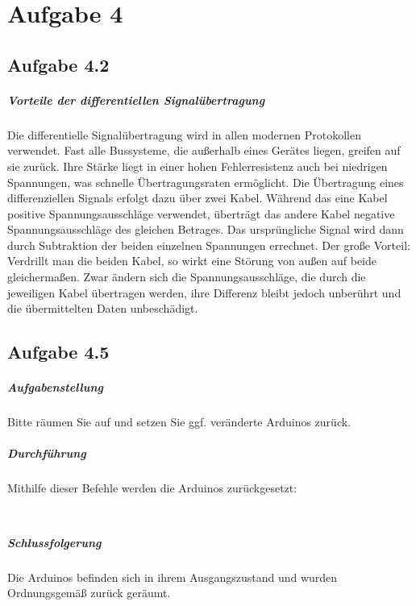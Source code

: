 \chapter{Aufgabe 4}
\section{Aufgabe 4.2}
\paragraph{Vorteile der differentiellen Signalübertragung}
Die differentielle Signalübertragung wird in allen modernen Protokollen verwendet. Fast alle Bussysteme, die außerhalb eines Gerätes liegen, greifen auf sie zurück. Ihre Stärke liegt in einer hohen Fehlerresistenz auch bei niedrigen Spannungen, was schnelle Übertragungsraten ermöglicht. Die Übertragung eines differenziellen Signals erfolgt dazu über zwei Kabel. Während das eine Kabel positive Spannungsausschläge verwendet, überträgt das andere Kabel negative Spannungsausschläge des gleichen Betrages. Das ursprüngliche Signal wird dann durch Subtraktion der beiden einzelnen Spannungen errechnet. Der große Vorteil: Verdrillt man die beiden Kabel, so wirkt eine Störung von außen auf beide gleichermaßen. Zwar ändern sich die Spannungsausschläge, die durch die jeweiligen Kabel übertragen werden, ihre Differenz bleibt jedoch unberührt und die übermittelten Daten unbeschädigt.




\section{Aufgabe 4.5}
\paragraph{Aufgabenstellung}
Bitte räumen Sie auf und setzen Sie ggf. veränderte Arduinos zurück.

\paragraph{Durchführung}
Mithilfe dieser Befehle werden die Arduinos zurückgesetzt:

\inputminted[breaklines, fontsize=\fontsize{10pt}{10pt}]{bash}{../docs/reset-dmx.txt}
\inputminted[breaklines, fontsize=\fontsize{10pt}{10pt}]{bash}{../docs/reset-rs323.txt}

\paragraph{Schlussfolgerung}
Die Arduinos befinden sich in ihrem Ausgangszustand und wurden Ordnungsgemäß zurück geräumt.
